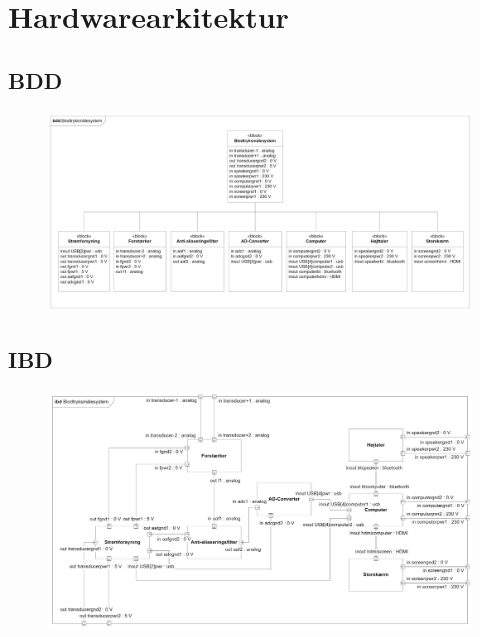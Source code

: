 \chapter{Hardwarearkitektur}
\section{BDD}
\vspace{0.5 cm}
\begin{figure}[h!]
	\centering
	\includegraphics[width=0.95\linewidth]{ArkitekturHardware/BDD}
\end{figure}

\section{IBD}
\vspace{0.5 cm}
\begin{figure}[h!]
	\centering
	\includegraphics[width=0.95\linewidth]{ArkitekturHardware/IBD}
\end{figure}
\clearpage

